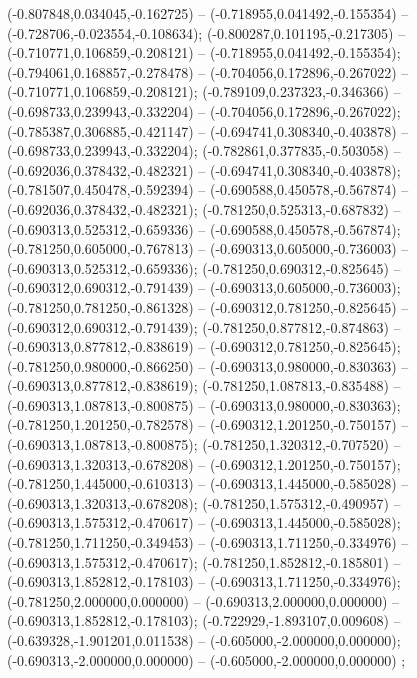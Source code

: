  (-0.807848,0.034045,-0.162725) -- (-0.718955,0.041492,-0.155354) -- (-0.728706,-0.023554,-0.108634);
 (-0.800287,0.101195,-0.217305) -- (-0.710771,0.106859,-0.208121) -- (-0.718955,0.041492,-0.155354);
 (-0.794061,0.168857,-0.278478) -- (-0.704056,0.172896,-0.267022) -- (-0.710771,0.106859,-0.208121);
 (-0.789109,0.237323,-0.346366) -- (-0.698733,0.239943,-0.332204) -- (-0.704056,0.172896,-0.267022);
 (-0.785387,0.306885,-0.421147) -- (-0.694741,0.308340,-0.403878) -- (-0.698733,0.239943,-0.332204);
 (-0.782861,0.377835,-0.503058) -- (-0.692036,0.378432,-0.482321) -- (-0.694741,0.308340,-0.403878);
 (-0.781507,0.450478,-0.592394) -- (-0.690588,0.450578,-0.567874) -- (-0.692036,0.378432,-0.482321);
 (-0.781250,0.525313,-0.687832) -- (-0.690313,0.525312,-0.659336) -- (-0.690588,0.450578,-0.567874);
 (-0.781250,0.605000,-0.767813) -- (-0.690313,0.605000,-0.736003) -- (-0.690313,0.525312,-0.659336);
 (-0.781250,0.690312,-0.825645) -- (-0.690312,0.690312,-0.791439) -- (-0.690313,0.605000,-0.736003);
 (-0.781250,0.781250,-0.861328) -- (-0.690312,0.781250,-0.825645) -- (-0.690312,0.690312,-0.791439);
 (-0.781250,0.877812,-0.874863) -- (-0.690313,0.877812,-0.838619) -- (-0.690312,0.781250,-0.825645);
 (-0.781250,0.980000,-0.866250) -- (-0.690313,0.980000,-0.830363) -- (-0.690313,0.877812,-0.838619);
 (-0.781250,1.087813,-0.835488) -- (-0.690313,1.087813,-0.800875) -- (-0.690313,0.980000,-0.830363);
 (-0.781250,1.201250,-0.782578) -- (-0.690312,1.201250,-0.750157) -- (-0.690313,1.087813,-0.800875);
 (-0.781250,1.320312,-0.707520) -- (-0.690313,1.320313,-0.678208) -- (-0.690312,1.201250,-0.750157);
 (-0.781250,1.445000,-0.610313) -- (-0.690313,1.445000,-0.585028) -- (-0.690313,1.320313,-0.678208);
 (-0.781250,1.575312,-0.490957) -- (-0.690313,1.575312,-0.470617) -- (-0.690313,1.445000,-0.585028);
 (-0.781250,1.711250,-0.349453) -- (-0.690313,1.711250,-0.334976) -- (-0.690313,1.575312,-0.470617);
 (-0.781250,1.852812,-0.185801) -- (-0.690313,1.852812,-0.178103) -- (-0.690313,1.711250,-0.334976);
 (-0.781250,2.000000,0.000000) -- (-0.690313,2.000000,0.000000) -- (-0.690313,1.852812,-0.178103);
 (-0.722929,-1.893107,0.009608) -- (-0.639328,-1.901201,0.011538) -- (-0.605000,-2.000000,0.000000);
 (-0.690313,-2.000000,0.000000) -- (-0.605000,-2.000000,0.000000) ;
